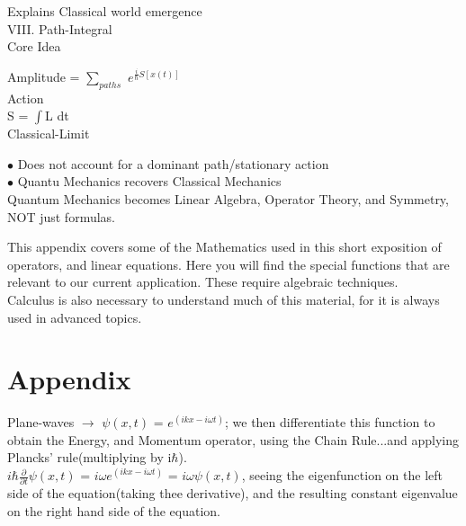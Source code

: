 \documentclass[10pt,fancy]{elegantbook}
\begin{document}
{Explains Classical world emergence  \\

VIII. Path-Integral \\ 

Core Idea  

Amplitude = $\sum_{paths}$ $e^{\frac{i}{\hbar} S[x(t)]}$  \\  

Action \\ 

S = $\int$L dt  \\  

Classical-Limit  

$\bullet$ Does not account for a dominant path/stationary action  \\

$\bullet$ Quantu Mechanics recovers Classical Mechanics \\ 

Quantum Mechanics becomes Linear Algebra, Operator Theory, and Symmetry, NOT just formulas.  \\


\appendix

\begin{remark}

This appendix covers some of the  Mathematics used in this short exposition of operators, and linear equations. Here you will find the special functions that are relevant to our current application. These require algebraic techniques.  \\

Calculus is also necessary to understand much of this material, for it is always used in advanced topics.  \\

\end{remark}

\chapter{Appendix}

Plane-waves $\longrightarrow$ $\psi(x,t)$ = $e^{(ikx - i\omega t)}$; we then differentiate this function to obtain the
Energy, and Momentum operator, using the Chain Rule...and applying Plancks' rule(multiplying by i$\hbar$).  \\

$i \hbar \frac{\partial}{\partial t} \psi(x,t)$ = $i \omega e^{(ikx - i \omega t)}$ = $i \omega \psi(x,t)$, seeing the eigenfunction on the left side of the equation(taking thee derivative), and the resulting constant eigenvalue on the right hand side of the equation.  \\

}
\end{document}
